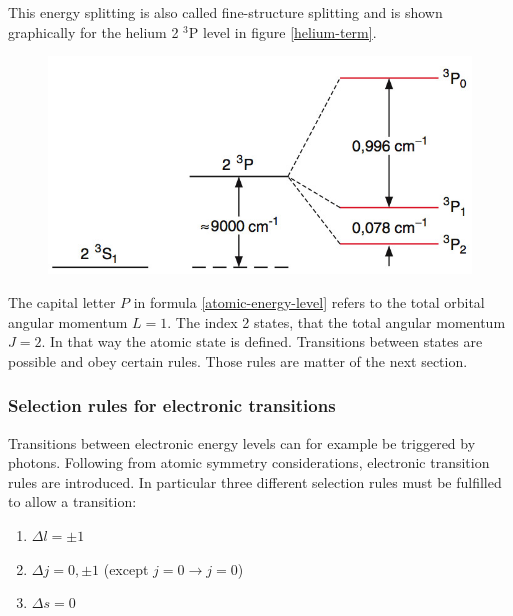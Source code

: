 \documentclass[parskip,12pt,headsepline,a4paper] {scrbook}
\begin{document}
This energy splitting is also called fine-structure splitting and is shown graphically for the helium 2 $^3$P level in figure \ref{helium-term}.

\begin{figure}[ht]
\centerline{
\includegraphics[width=12cm]{./spectroscopy/helium-terms.jpg}}
\end{figure}

The capital letter $P$ in formula \ref{atomic-energy-level} refers to the total orbital angular momentum $L = 1$. The index 2 states, that the total angular momentum $J = 2$. In that way the atomic state is defined.
Transitions between states are possible and obey certain rules. Those rules are matter of the next section.

\subsubsection{Selection rules for electronic transitions}
\vspace{-1\baselineskip}
Transitions between electronic energy levels can for example be triggered by photons. Following from atomic symmetry considerations, electronic transition rules are introduced. In particular three different selection rules must be fulfilled to allow a transition:

\begin{enumerate}
\item $\Delta l = \pm 1$
\item $\Delta j = 0, \pm1$ (except $j=0 \rightarrow j=0$)
\item $\Delta s = 0$
\end{enumerate}
\end{document}

